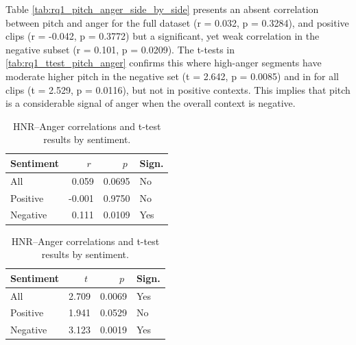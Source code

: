   Table \ref{tab:rq1_pitch_anger_side_by_side} presents an absent correlation between pitch and anger for the full dataset (r = 0.032, p = 0.3284), and positive clips (r = -0.042, p = 0.3772) but a significant, yet weak correlation in the negative subset (r = 0.101, p = 0.0209). 
  The t-tests in \ref{tab:rq1_ttest_pitch_anger} confirms this where high-anger segments have moderate higher pitch in the negative set (t = 2.642, p = 0.0085) and in for all clips (t = 2.529, p = 0.0116), but not in positive contexts. 
  This implies that pitch is a considerable signal of anger when the overall context is negative. 

  \begin{table}[H]
    \centering
  
    \begin{subtable}{0.45\textwidth}
      \centering
      \caption{HNR and Anger (r)}\label{tab:rq1_corr_hnr_anger}
      \begin{tabular}{l r r l}
        \toprule
        Sentiment & \(\;r\;\) & \(\;p\;\) & Sign. \\
        \midrule
        All        &  0.059        & 0.0695    & No          \\
        Positive   & -0.001        & 0.9750    & No          \\
        Negative   &  0.111        & 0.0109    & Yes         \\
        \bottomrule
      \end{tabular}
    \end{subtable}\hfill
    \begin{subtable}{0.45\textwidth}
      \centering
      \caption{HNR and Anger (t-test)}\label{tab:rq1_ttest_hnr_anger}
      \begin{tabular}{l r r l}
        \toprule
        Sentiment & \(\;t\;\) & \(\;p\;\) & Sign. \\
        \midrule
        All        &  2.709      & 0.0069    & Yes         \\
        Positive   &  1.941      & 0.0529    & No          \\
        Negative   &  3.123      & 0.0019    & Yes         \\
        \bottomrule
      \end{tabular}
    \end{subtable}
  
    \caption{HNR–Anger correlations and t-test results by sentiment.}
    \label{tab:rq1_hnr_anger_side_by_side}
  \end{table}
  
